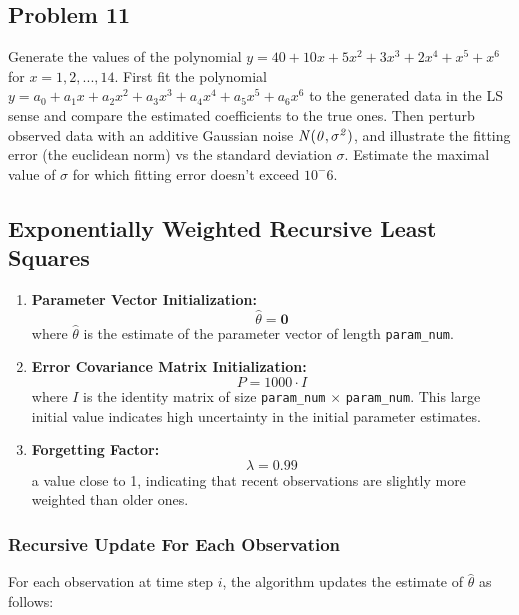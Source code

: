 \subsection{Problem 11}%
\label{sec:problem_11}
Generate the values of the polynomial $y = 40 + 10x + 5x^2 + 3x^3 + 2x^4 + x^5 + x^6$
for $x = 1, 2, ..., 14$. First fit the polynomial $y = a_0 + a_1x + a_2x^2 + a_3x^3 + a_4x^4 + a_5x^5 + a_6x^6$
to the generated data in the LS sense and compare the estimated coefficients to the true ones. Then perturb observed data with an additive Gaussian noise
$\it{N}(0,\sigma^2)$, and illustrate the fitting error (the euclidean norm) vs the standard deviation $\sigma$. 
Estimate the maximal value of $\sigma$ for which fitting error doesn't exceed $10^-6$.
\subsection*{Exponentially Weighted Recursive Least Squares}
\begin{enumerate}
    \item \textbf{Parameter Vector Initialization:}
    \[ \hat{\theta} = \mathbf{0} \]
    where \( \hat{\theta} \) is the estimate of the parameter vector of length \texttt{param\_num}.
    
    \item \textbf{Error Covariance Matrix Initialization:}
    \[ P = 1000 \cdot I \]
    where \( I \) is the identity matrix of size \texttt{param\_num} $\times$ \texttt{param\_num}. This large initial value indicates high uncertainty in the initial parameter estimates.
    
    \item \textbf{Forgetting Factor:}
    \[ \lambda = 0.99 \]
    a value close to 1, indicating that recent observations are slightly more weighted than older ones.
\end{enumerate}

\subsubsection*{Recursive Update For Each Observation}

For each observation at time step \(i\), the algorithm updates the estimate of \( \hat{\theta} \) as follows:

